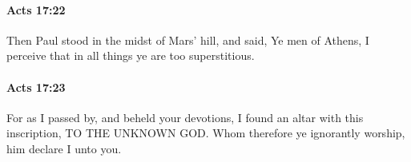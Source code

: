 		\paragraph{Acts 17:22} %
			\label{ACTS-17-22}

			Then Paul stood in the midst of Mars' hill, and said, Ye men of Athens, I perceive that in all things ye are too superstitious.

			\begin{framed}
			\scriptsize
				\begin{compactdesc}
					\item[SBLG] 
				\end{compactdesc}
			\end{framed}

		\paragraph{Acts 17:23} %
			\label{ACTS-17-23}

			For as I passed by, and beheld your devotions, I found an altar with this inscription, TO THE UNKNOWN GOD.  Whom therefore ye ignorantly worship, him declare I unto you.

